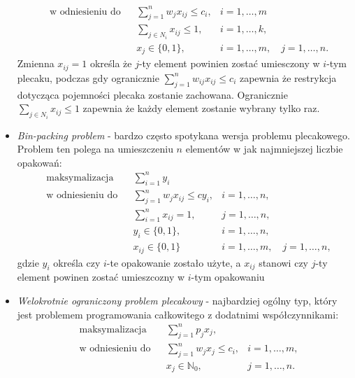 \begin{itemize}
\begin{equation}
\begin{aligned}
      & \textrm{w odniesieniu do} & & \sum_{j=1}^n  w_jx_{ij} \le c_i, & i =1,\dots,m \\
      &&& \sum_{j \in N_i} x_{ij} \le 1, & i =1,\dots,k, \\
      &&& x_j \in\{0,1\},& i = 1,\dots,m, \quad j =1,\dots,n.
    \end{aligned}
  \end{equation}
  Zmienna $x_{ij} = 1$ określa że $j$-ty element powinien zostać umiesczony w $i$-tym plecaku, podczas gdy ogranicznie $\sum_{j=1}^n  w_{ij}x_{ij} \le c_i$ zapewnia że restrykcja dotycząca pojemności plecaka zostanie zachowana. Ogranicznie $\sum_{j \in N_i} x_{ij} \le 1$ zapewnia że każdy element zostanie wybrany tylko raz.
  \item \textit{Bin-packing problem} - bardzo często spotykana wersja problemu plecakowego. Problem ten polega na umieszczeniu $n$ elementów w jak najmniejszej liczbie opakowań:
  \begin{equation}\label{binPacking}
    \begin{aligned}
      & \textrm{maksymalizacja} & & \sum_{i=1}^n y_i \\
      & \textrm{w odniesieniu do} & & \sum_{j=1}^n w_jx_{ij} \le cy_i, & i=1,\dots,n, \\
      &&& \sum_{i=1}^n x_{ij} = 1, & j=1,\dots,n, \\
      &&& y_i \in \{0,1\}, & i=1,\dots,n, \\
      &&& x_{ij} \in \{0,1\} & i=1,\dots,m, \quad j = 1,\dots,n,
    \end{aligned}
  \end{equation}
  gdzie $y_i$ określa czy $i$-te opakowanie zostało użyte, a $x_{ij}$ stanowi czy $j$-ty element powinen zostać umieszcozny w $i$-tym opakowaniu
  \item \textit{Welokrotnie ograniczony problem plecakowy} - najbardziej ogólny typ, który jest problemem programowania całkowitego z dodatnimi współczynnikami:
  \begin{equation}\label{generalKnapsack}
    \begin{aligned}
      & \textrm{maksymalizacja} & & \sum_{j=1}^n p_jx_j, \\
      & \textrm{w odniesieniu do} & & \sum_{j=1}^n w_jx_j \le c_i, & i=1,\dots,m, \\
      &&& x_j \in \mathbb{N}_0, & j = 1,\dots,n.
    \end{aligned}
  \end{equation}
\end{itemize}

